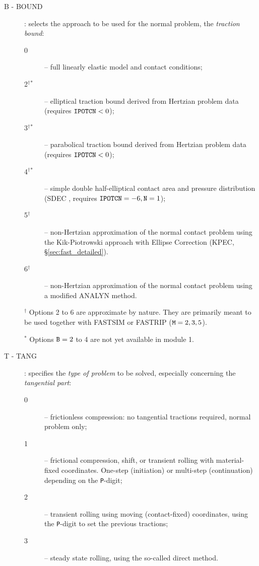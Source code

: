 \documentclass[12pt]{report}
\renewcommand{\magenta}[1]{}
\begin{document}
\begin{description}
\item[B - BOUND]  \label{b-digit}  : selects the approach to be
        used for the normal problem, the {\em traction bound\/}:
\begin{description}
\item[0] -- full linearly elastic model and contact conditions;
\magenta{
\item[1] -- full linearly elastic model, extended with a thin, compressible
        elastic layer, with full contact conditions (\S \ref{sec:thin_sheet});
}
\item[2$^\dagger$$^*$] -- elliptical traction bound derived from Hertzian
        problem data (requires ${\tt IPOTCN}<0$);
\item[3$^\dagger$$^*$] -- parabolical traction bound derived from Hertzian
        problem data (requires ${\tt IPOTCN}<0$);
\item[4$^\dagger$$^*$] -- simple double half-elliptical contact area and
        pressure distribution (SDEC \cite{Piotrowski2017}, requires
        ${\tt IPOTCN}=-6, {\tt N}=1$);
\item[5$^\dagger$] -- non-Hertzian approximation of the normal contact problem
        using the Kik-Piotrowski approach with Ellipse Correction (KPEC,
        \S \ref{sec:fast_detailed}).
\item[6$^\dagger$] -- non-Hertzian approximation of the normal contact problem
        using a modified ANALYN method.
\end{description}
$^\dagger$ Options 2 to 6 are approximate by nature. They are primarily meant
to be used together with FASTSIM or FASTRIP (${\tt M}=2, 3, 5$).

$^*$ Options ${\tt B}=2$ to 4 are not yet available in module 1.

\item[T - TANG]  \label{t-digit}  : specifies the {\em type of problem\/}
        to be solved, especially concerning the {\em tangential part\/}:
\begin{description}
\item[0] -- frictionless compression: no tangential tractions
        required, normal problem only;
\item[1] -- frictional compression, shift, or transient rolling with
        material-fixed coordinates. One-step (initiation) or multi-step
        (continuation) depending on the {\tt P}-digit;
\item[2] -- transient rolling using moving (contact-fixed) coordinates,
        using the {\tt P}-digit to set the previous tractions;
\item[3] -- steady state rolling, using the so-called direct method.
\end{description}


\end{description}
\end{document}
